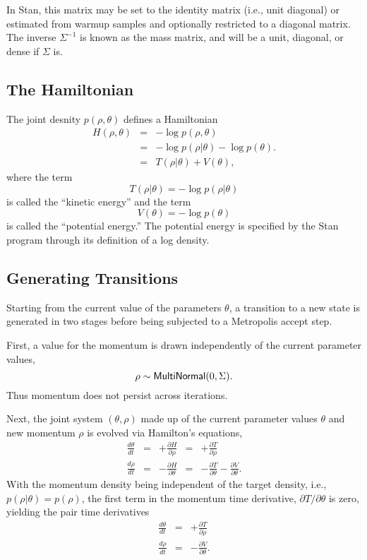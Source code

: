 In Stan, this matrix may be set to the identity matrix (i.e., unit
diagonal) or estimated from warmup samples and optionally restricted
to a diagonal matrix. The inverse $\Sigma^{-1}$ is known as the mass
matrix, and will be a unit, diagonal, or dense if $\Sigma$ is.

\subsection{The Hamiltonian}

The joint desnity $p(\rho,\theta)$ defines a Hamiltonian
%
\begin{eqnarray*}
H(\rho,\theta) & = & - \log p(\rho,\theta)
\\[3pt]
& = & - \log p(\rho|\theta) - \log p(\theta).
\\[3pt]
& = & T(\rho|\theta) + V(\theta),
\end{eqnarray*}
%
where the term
\[
T(\rho|\theta) = - \log p(\rho | \theta)
\]
is called the ``kinetic energy'' and the term
\[
V(\theta) = - \log p(\theta)
\]
is called the ``potential energy.''  The potential energy is specified
by the Stan program through its definition of a log density. 

\subsection{Generating Transitions}

Starting from the current value of the parameters $\theta$, a
transition to a new state is generated in two stages before being
subjected to a Metropolis accept step.  

First, a value for the momentum is drawn independently of the current
parameter values,
%
\[
\rho \sim \distro{MultiNormal}(0,\Sigma).
\]
%
Thus momentum does not persist across iterations. 

Next, the joint system $(\theta,\rho)$ made up of the current
parameter values $\theta$ and new momentum $\rho$ is evolved
via Hamilton's equations,
%
\[
\begin{array}{rcccl}
\displaystyle
\frac{d\theta}{dt} 
& = &
\displaystyle
+ \frac{\partial H}{\partial \rho} 
& = &
\displaystyle
+ \frac{\partial T}{\partial \rho}
\\[12pt]
\displaystyle
\frac{d\rho}{dt} 
& = & 
\displaystyle
- \frac{\partial H}{\partial \theta } 
& = & 
\displaystyle
- \frac{\partial T}{\partial \theta}
- \frac{\partial V}{\partial \theta}.
\end{array}
\]
%
With the momentum density being independent of the target density,
i.e., $p(\rho|\theta) = p(\rho)$, the first term in the
momentum time derivative, ${\partial T} / {\partial \theta}$ is
zero, yielding the pair time derivatives
%
\begin{eqnarray*}
\frac{d \theta}{d t} & = & +\frac{\partial T}{\partial \rho}
\\[2pt]
\frac{d \rho}{d t} & = & -\frac{\partial V}{\partial \theta}.
\end{eqnarray*}

